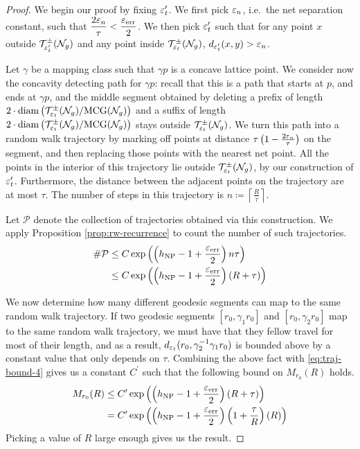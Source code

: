 \begin{proof}
  We begin our proof by fixing $\varepsilon_t^{\prime}$.
  We first pick $\varepsilon_n$, i.e.\ the net separation constant, such that $\displaystyle \frac{2\varepsilon_n}{\tau} < \frac{\varepsilon_{\mathrm{err}}}{2}$.
  We then pick $\varepsilon_t^{\prime}$ such that for any point $x$ outside $\mathcal{T}_{\varepsilon_t^{\prime}}^{\pm}(\mathcal{N}_g)$ and any point inside $\mathcal{T}_{\varepsilon_t}^{\pm}(\mathcal{N}_g)$, $d_{\varepsilon_t^{\prime}}(x, y) > \varepsilon_n$.

  Let $\gamma$ be a mapping class such that $\gamma p$ is a concave lattice point.
  We consider now the concavity detecting path for $\gamma p$: recall that this is a path that starts at $p$, and ends at $\gamma p$, and the middle segment obtained by deleting a prefix of length $2 \cdot \mathrm{diam} \left( \mathcal{T}_{\varepsilon_t}^{\pm}(\mathcal{N}_g)/\mathrm{MCG}(\mathcal{N}_g) \right)$ and a suffix of length $2 \cdot \mathrm{diam} \left( \mathcal{T}_{\varepsilon_t}^{\pm}(\mathcal{N}_g)/\mathrm{MCG}(\mathcal{N}_g) \right)$ stays outside $\mathcal{T}_{\varepsilon_t}^{\pm}(\mathcal{N}_g)$.
  We turn this path into a random walk trajectory by marking off points at distance $\tau\left( 1 - \frac{2\varepsilon_n}{\tau} \right)$ on the segment, and then replacing those points with the nearest net point.
  All the points in the interior of this trajectory lie outside $\mathcal{T}_{\varepsilon_t}^{\pm}(\mathcal{N}_g)$, by our construction of $\varepsilon_t^{\prime}$.
  Furthermore, the distance between the adjacent points on the trajectory are at most $\tau$.
  The number of steps in this trajectory is $\displaystyle n \coloneqq \left\lceil \frac{R}{\tau} \right\rceil$.

  Let $\mathcal{P}$ denote the collection of trajectories obtained via this construction.
  We apply Proposition \ref{prop:rw-recurrence} to count the number of such trajectories.
  \begin{align}
    \# \mathcal{P} &\leq C \exp\left(\left(h_{\mathrm{NP}} - 1 + \frac{\varepsilon_{\mathrm{err}}}{2}\right) n\tau\right) \\
                   &\leq C \exp\left(\left(h_{\mathrm{NP}} - 1 + \frac{\varepsilon_{\mathrm{err}}}{2}\right) (R + \tau)\right) \label{eq:traj-bound-4}
  \end{align}

  We now determine how many different geodesic segments can map to the same random walk trajectory.
  If two geodesic segments $[r_0, \gamma_1 r_0]$ and $[r_0, \gamma_2 r_0]$ map to the same random walk trajectory, we must have that they fellow travel for most of their length, and as a result, $d_{\varepsilon_t}(r_0, \gamma_2^{-1} \gamma_1 r_0)$ is bounded above by a constant value that only depends on $\tau$.
  Combining the above fact with \eqref{eq:traj-bound-4} gives us a constant $C^{\prime}$ such that the following bound on $M_{r_0}(R)$ holds.
  \begin{align*}
    M_{r_0}(R) &\leq C^{\prime} \exp\left(\left(h_{\mathrm{NP}} - 1 + \frac{\varepsilon_{\mathrm{err}}}{2}\right) (R + \tau)\right) \\
    &= C^{\prime} \exp\left(\left(h_{\mathrm{NP}} - 1 + \frac{\varepsilon_{\mathrm{err}}}{2}\right) \left(1 + \frac{\tau}{R}\right) (R)\right)
  \end{align*}
  Picking a value of $R$ large enough gives us the result.
\end{proof}

